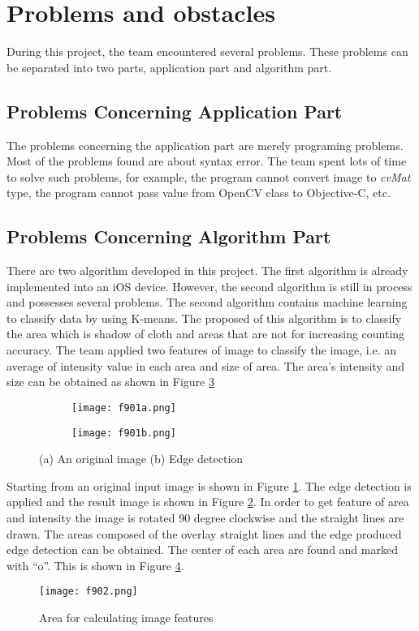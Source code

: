 \section{Problems and obstacles}
During this project, the team encountered several problems. These problems can be separated into two parts, application part and algorithm part.
\subsection{Problems Concerning Application Part}
The problems concerning the application part are merely programing problems. Most of the problems found are about syntax error. The team spent lots of time to solve such problems, for example, the program cannot convert image to \textit{cvMat} type, the program cannot pass value from OpenCV class to Objective-C, etc.
\subsection{Problems Concerning Algorithm Part}
There are two algorithm developed in this project. The first algorithm is already implemented into an iOS device. However, the second algorithm is still in process and possesses several problems. The second algorithm contains machine learning to classify data by using K-means. The proposed of this algorithm is to classify the area which is shadow of cloth and areas that are not for increasing counting accuracy. The team applied two features of image to classify the image, i.e. an average of intensity value in each area and size of area. The area’s intensity and size can be obtained as shown in Figure \ref{fig:f901}
\begin{figure}[t]
	\centering
	\begin{subfigure}[b]{0.4\textwidth}
		\texttt{[image: f901a.png]}
		\caption{}\label{fig:f901a}
	\end{subfigure}
	\begin{subfigure}[b]{0.4\textwidth}
		\texttt{[image: f901b.png]}
		\caption{}\label{fig:f901b}
	\end{subfigure}
	\caption{(a) An original image (b) Edge detection}
	\label{fig:f901}
\end{figure}

Starting from an original input image is shown in Figure \ref{fig:f901a}. The edge detection is applied and the result image is shown in Figure \ref{fig:f901b}. In order to get feature of area and intensity the image is rotated 90 degree clockwise and the straight lines are drawn. The areas composed of the overlay straight lines and the edge produced edge detection can be obtained. The center of each area are found and marked with “o”. This is shown in Figure \ref{fig:f902}.
\begin{figure}[t]
	\centering
	\texttt{[image: f902.png]}
	\caption{Area for calculating image features}
	\label{fig:f902}
\end{figure}

